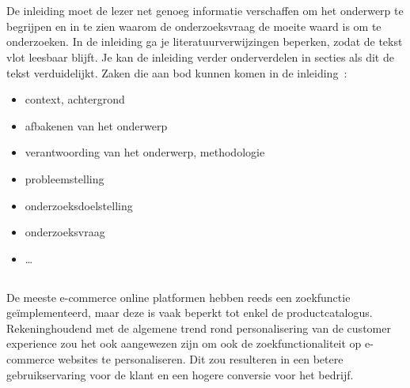 
\chapter{}
\label{ch:inleiding}

De inleiding moet de lezer net genoeg informatie verschaffen om het onderwerp te begrijpen en in te zien waarom de onderzoeksvraag de moeite waard is om te onderzoeken. In de inleiding ga je literatuurverwijzingen beperken, zodat de tekst vlot leesbaar blijft. Je kan de inleiding verder onderverdelen in secties als dit de tekst verduidelijkt. Zaken die aan bod kunnen komen in de inleiding~\autocite{Pollefliet2011}:

\begin{itemize}
  \item context, achtergrond
  \item afbakenen van het onderwerp
  \item verantwoording van het onderwerp, methodologie
  \item probleemstelling
  \item onderzoeksdoelstelling
  \item onderzoeksvraag
  \item \ldots
\end{itemize}

\section{}
\label{sec:probleemstelling}

De meeste e-commerce online platformen hebben reeds een zoekfunctie geïmplementeerd,  maar deze is vaak beperkt tot enkel de productcatalogus. Rekeninghoudend met de algemene trend rond personalisering van de customer experience zou het ook aangewezen zijn om ook de zoekfunctionaliteit op e-commerce websites te personaliseren. Dit zou resulteren in een betere  gebruikservaring voor de klant en een hogere conversie voor het bedrijf.

\section{}
\label{sec:onderzoeksvraag}

